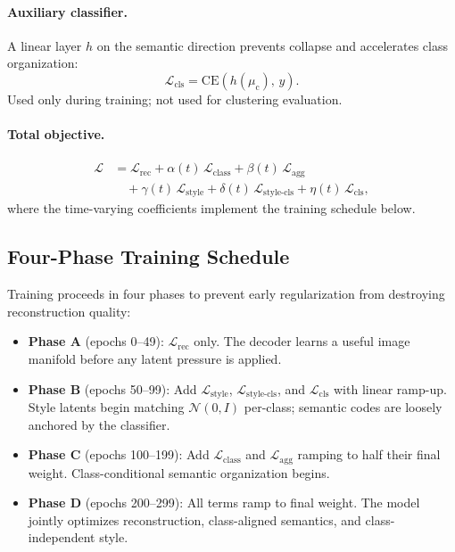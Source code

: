\documentclass[10pt]{article}
\newcommand{\muc}{\mu_{\mathrm{c}}}
\newcommand{\CE}{\mathrm{CE}}
\begin{document}
\paragraph{Auxiliary classifier.}
A linear layer $h$ on the semantic direction prevents collapse and accelerates
class organization:
\begin{equation}
  \mathcal{L}_{\mathrm{cls}} = \CE(h(\muc),\,y).
  \label{eq:cls}
\end{equation}
Used only during training; not used for clustering evaluation.

\paragraph{Total objective.}
\begin{align}
  \mathcal{L}
  &= \mathcal{L}_{\mathrm{rec}}
   + \alpha(t)\,\mathcal{L}_{\mathrm{class}}
   + \beta(t)\,\mathcal{L}_{\mathrm{agg}} \nonumber\\
  &\quad + \gamma(t)\,\mathcal{L}_{\mathrm{style}}
   + \delta(t)\,\mathcal{L}_{\mathrm{style\text{-}cls}}
   + \eta(t)\,\mathcal{L}_{\mathrm{cls}},
  \label{eq:total}
\end{align}
where the time-varying coefficients implement the training schedule below.

\subsection{Four-Phase Training Schedule}

Training proceeds in four phases to prevent early regularization from destroying
reconstruction quality:
\begin{itemize}
  \item \textbf{Phase A} (epochs 0--49):
        $\mathcal{L}_{\mathrm{rec}}$ only.
        The decoder learns a useful image manifold before any latent pressure is applied.
  \item \textbf{Phase B} (epochs 50--99):
        Add $\mathcal{L}_{\mathrm{style}}$, $\mathcal{L}_{\mathrm{style\text{-}cls}}$,
        and $\mathcal{L}_{\mathrm{cls}}$ with linear ramp-up.
        Style latents begin matching $\mathcal{N}(0,I)$ per-class; semantic codes are
        loosely anchored by the classifier.
  \item \textbf{Phase C} (epochs 100--199):
        Add $\mathcal{L}_{\mathrm{class}}$ and $\mathcal{L}_{\mathrm{agg}}$ ramping
        to half their final weight.
        Class-conditional semantic organization begins.
  \item \textbf{Phase D} (epochs 200--299):
        All terms ramp to final weight.
        The model jointly optimizes reconstruction, class-aligned semantics, and
        class-independent style.
\end{itemize}
\end{document}
